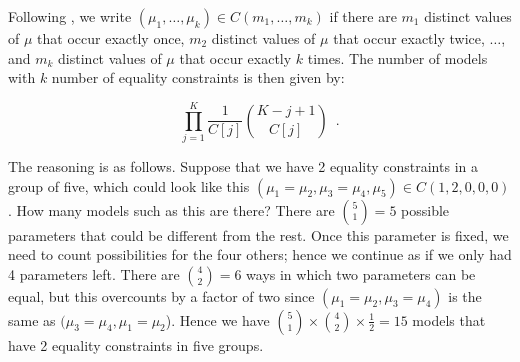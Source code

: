 \documentclass[]{article}
\begin{document}
Following \textcite{gopalan1998bayesian}, we write $(\mu_1, \ldots, \mu_k) \in C(m_1, \ldots, m_k)$ if there are $m_1$ distinct values of $\mu$ that occur exactly once, $m_2$ distinct values of $\mu$ that occur exactly twice, $\ldots$, and $m_k$ distinct values of $\mu$ that occur exactly $k$ times. The number of models with $k$ number of equality constraints is then given by:

\begin{equation}
    \prod_{j = 1}^K \frac{1}{C[j]}{K - j + 1 \choose C[j]} \enspace .
\end{equation}

The reasoning is as follows. Suppose that we have 2 equality constraints in a group of five, which could look like this $(\mu_1 = \mu_2, \mu_3 = \mu_4, \mu_5) \in C(1, 2, 0, 0, 0)$. How many models such as this are there? There are ${5 \choose 1} = 5$ possible parameters that could be different from the rest. Once this parameter is fixed, we need to count possibilities for the four others; hence we continue as if we only had 4 parameters left. There are ${4 \choose 2} = 6$ ways in which two parameters can be equal, but this overcounts by a factor of two since $(\mu_1 = \mu_2, \mu_3 = \mu_4)$ is the same as $(\mu_3 = \mu_4, \mu_1 = \mu_2$). Hence we have ${5 \choose 1} \times {4 \choose 2} \times \frac{1}{2} = 15$ models that have 2 equality constraints in five groups.



\printbibliography
\end{document}
